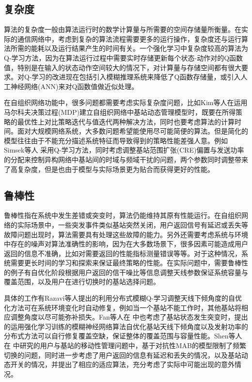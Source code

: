 ﻿\documentclass[11pt,draftclsnofoot,onecolumn,journal,letterpaper]{IEEEtran}
\begin{document}
\subsection{复杂度}
算法的复杂度一般由算法运行时的数学计算量与所需要的空间存储量所衡量。在实际的通信网络中，考虑到复杂的算法流程需要更多的运行操作，复杂度还与运行算法所需的能耗以及运行结果产生的时间有关。一个强化学习中复杂度较高的算法为Q-学习方法，因为在算法运行过程中需要实时存储更新每个状态-动作对的Q函数值，特别是在输入的状态动作空间较大的情况下，对计算量与存储空间都有很大要求。对Q-学习的改进现在包括引入模糊推理系统来降低了Q函数存储量，或引入人工神经网络(ANN)来对Q函数值做近似处理\cite{Ghadimi2017}。

在自组织网络功能中，很多问题都需要考虑实际复杂度问题，比如Kim等人\cite{Kim2014}在运用马尔科夫决策过程(MDP)建立自组织网络中基站动态管理模型时，既要在所得策略的最优性上对比策略迭代与值迭代两种解决方法，同时也要考虑算法的计算时间。面对大规模网络系统，大多数问题希望能使用尽可能简便的算法。但是简化的模型往往由于不能充分描述系统特征而导致得到的策略性能差强人意。例如Simsek等人\cite{Simsek2015} 采用Q-学习方法，同时考虑调整基站范围扩张(CRE)偏置与发送功率的分配来控制异构网络中基站间的时域与频域干扰的问题，两个参数同时调整带来了高复杂度，但是也由于模型与实际场景更为贴合而获得更好的性能。

\subsection{鲁棒性}
鲁棒性指在系统中发生差错或突变时，算法仍能维持其原有性能运行。在自组织网络的实际场景中，一些突发事件类似基站突然关闭，用户返回信号有延迟或丢失等故障问题出现时，算法需要具有处理这些故障的能力。另外还需要考虑系统与环境中存在的噪声对算法准确性的影响，因为在大多数场景下，很多因素可能造成用户返回的信息不准确，比如对需要返回的性能指标测量错误等等。对于这种情况，系统需要更长时间的学习和探索来保证最终策略的性能。在实际问题中，需要鲁棒性的例子有自优化阶段根据用户返回的信干噪比等信息调整天线参数保证系统容量与覆盖范围，以及用户在进行切换时的基站选择问题。

具体的工作有Razavi等人\cite{Razavi2010}提出的利用分布式模糊Q-学习调整天线下倾角度的自优化方法可在系统环境变化时自动修复，例如当一个基站不能工作时，其他基站将相应调整角度以尽可能弥补损失。Fan等人在\cite{Fan2014} 中也考虑了基站状态发生突变时，提出的运用强化学习训练的模糊神经网络算法自优化基站天线下倾角度以及发射功率的分布式方法可以自行修复覆盖空缺，保证整体的覆盖范围与容量性能。Shen等人在\cite{Shen2016} 中研究的用户与基站的移动性管理问题中，基于对抗性MAB的模型限制了频繁切换的问题，同时进一步考虑了用户返回的信息有延迟和丢失的情况，以及基站动态开关的情况，并提出了相应的适应算法，充分考虑了实际中可能出现的意外情况。
\end{document}
